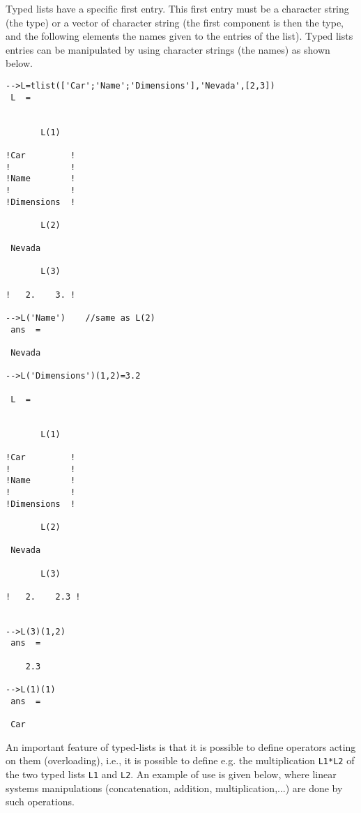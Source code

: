 Typed lists have a specific first entry. This first entry must be a 
character string (the type) or a vector of character string (the first
component is then the type, and the following elements the names given
to the entries of the list). Typed lists entries can be manipulated
by using character strings (the names) as shown below.

\begin{verbatim}
-->L=tlist(['Car';'Name';'Dimensions'],'Nevada',[2,3])
 L  =
 
 
       L(1)
 
!Car         !
!            !
!Name        !
!            !
!Dimensions  !
 
       L(2)
 
 Nevada   
 
       L(3)
 
!   2.    3. !

-->L('Name')    //same as L(2)
 ans  =
 
 Nevada   
 
-->L('Dimensions')(1,2)=3.2

 L  =
 
 
       L(1)
 
!Car         !
!            !
!Name        !
!            !
!Dimensions  !
 
       L(2)
 
 Nevada   
 
       L(3)
 
!   2.    2.3 !
 

-->L(3)(1,2)
 ans  =
 
    2.3  

-->L(1)(1)
 ans  =
 
 Car
\end{verbatim}
An important feature of typed-lists is that it is possible to define
operators acting on them (overloading), i.e., it is possible
to define e.g. the multiplication \verb!L1*L2! of the two typed lists 
\verb!L1! and \verb!L2!. An example of use is given below, where
linear systems manipulations (concatenation, addition,
multiplication,...) are done by such operations.

